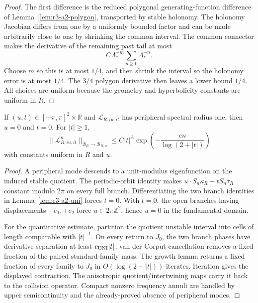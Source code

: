 \begin{proof}
The first difference is the reduced polygonal generating-function difference
of Lemma~\ref{lem:r3-a2-polygon}, transported by stable holonomy.  The
holonomy Jacobian differs from one by a uniformly bounded factor and can be
made arbitrarily close to one by shrinking the common interval.  The common
connector makes the derivative of the remaining past tail at most
\[
 C\Lambda_*^{-m}\sum_{n\ge0}\Lambda_*^{-n}.
\]
Choose \(m\) so this is at most \(1/4\), and then shrink the interval so the
holonomy error is at most \(1/4\).  The \(3/4\) polygon derivative then leaves
a lower bound \(1/4\).  All choices are uniform because the geometry and
hyperbolicity constants are uniform in \(R\).
\end{proof}

\begin{theorem}
\label{thm:r3-a2-high}
If \((u,t)\in[-\pi,\pi]^2\times\mathbb R\) and
\(\mathcal L_{R,iu,it}\) has peripheral spectral radius one, then
\(u=0\) and \(t=0\).  For \(|t|\ge1\),
\[
 \|\mathcal L_{R,iu,it}^n\|_{\mathcal B_R\to\mathcal B_{R,w}}
 \le C|t|^A\exp\left(-\frac{cn}{\log(2+|t|)}\right)
\]
with constants uniform in \(R\) and \(u\).
\end{theorem}

\begin{proof}
A peripheral mode descends to a unit-modulus eigenfunction on the induced
stable quotient.  The periodic-orbit identity makes
\(u\cdot S_n\kappa_R-tS_n\tau_R\) constant modulo \(2\pi\) on every full
branch.  Differentiating the two branch identities in
Lemma~\ref{lem:r3-a2-uni} forces \(t=0\).  With \(t=0\), the open branches
having displacements \(\pm e_1,\pm e_2\) force
\(u\in2\pi\mathbb Z^2\), hence \(u=0\) in the fundamental domain.

For the quantitative estimate, partition the quotient unstable interval into
cells of length comparable with \(|t|^{-1}\).  On every return to \(J_0\),
the two branch phases have derivative separation at least
\(c_{\rm UNI}|t|\); van der Corput cancellation removes a fixed fraction of
the paired standard-family mass.  The growth lemma returns a fixed fraction
of every family to \(J_0\) in \(O(\log(2+|t|))\) iterates.  Iteration gives
the displayed contraction.  The anisotropic quotient/intertwining maps carry
it back to the collision operator.  Compact nonzero frequency annuli are
handled by upper semicontinuity and the already-proved absence of peripheral
modes.
\end{proof}
